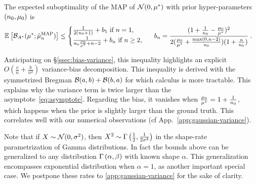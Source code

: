 \begin{theorem}
\label{thm:varianceMAP}
The expected suboptimality of the MAP of ${\mathcal N}(0,\mu^*)$ with prior hyper-parameters $(n_0,\mu_0)$ is
 \begin{align}
	\mathbb{E}_{} \left[ {\mathcal B}_{A^*}( \mu^*; \hat {\mu}_n^\mathrm{MAP}) \right] 
	\leq \begin{cases}
		\frac{1}{2(n_0+1)}  +  b_1 \ \text{if}\ n=1,\\
		\frac{1}{n_0 \frac{\mu_0}{\mu^*} +n-2} + b_n \ \text{if}\ n\geq 2,
	\end{cases}
	\label{eq:MAP_rate} \;\;
	b_n = \frac{(1 + \frac{1}{n_0} - \frac{\mu_0}{\mu^*})^2}{2 (\frac{\mu_0}{\mu^*}+\frac{\max(0,n-2)}{n_0})(1 + \frac{n}{n_0} )} \; .
\end{align}
\end{theorem}
Anticipating on \S\ref{ssec:bias-variance}, this inequality highlights an explicit $O(\frac{v}{n} + \frac{b}{n^2})$ variance-bias decomposition.
This inequality is derived with the symmetrized Bregman ${\mathcal B}(a,b) + {\mathcal B}(b,a)$ for which calculus is more tractable.
This explains why the variance term is twice larger than the asymptote~\eqref{eq:asymptote}.
Regarding the bias, it vanishes when $\frac{\mu_0}{\mu^*} =1 + \frac{1}{n_0} $, which happens when the prior is slightly larger than the ground truth.
This correlates well with our numerical observations (cf App.~\ref{app:gaussian-variance}).

Note that if $X\sim {\mathcal N}(0,\sigma^2)$, then $X^2 \sim \Gamma\left(\frac{1}{2}, \frac{1}{2\sigma^2}\right)$ in the shape-rate parametrization of Gamma distributions. In fact the bounds above can be generalized to any distribution $\Gamma\left(\alpha, \beta\right)$ with known shape $\alpha$.
This generalization encompasses exponential distribution when $\alpha=1$, as another important special case.
 We postpone these rates to \cref{app:gaussian-variance} for the sake of clarity.

